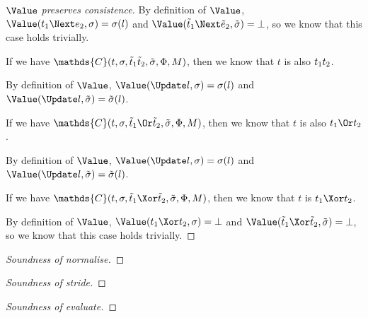\begin{proof}[$\Value$ preserves consistence]
{    By definition of $\Value$, $\Value(t_1\Next e_2,\sigma)=\sigma(l)$ and $\Value(\tilde{t}_1\Next \tilde{e}_2,\tilde{\sigma})=\bot$, so we know that this case holds trivially.

    }

    {
    If we have $\mathds{C}(t,\sigma,\tilde{t}_1\And \tilde{t}_2,\tilde{\sigma},\Phi,M)$, then we know that $t$ is also $t_1\relax t_2$.

    By definition of $\Value$, $\Value(\Update l,\sigma)=\sigma(l)$ and $\Value(\Update l,\tilde{\sigma})=\tilde{\sigma}(l)$.

    }

    {
    If we have $\mathds{C}(t,\sigma,\tilde{t}_1\Or \tilde{t}_2,\tilde{\sigma},\Phi,M)$, then we know that $t$ is also $t_1\Or t_2$.

    By definition of $\Value$, $\Value(\Update l,\sigma)=\sigma(l)$ and $\Value(\Update l,\tilde{\sigma})=\tilde{\sigma}(l)$.

    }

    {
    If we have $\mathds{C}(t,\sigma,\tilde{t}_1\Xor \tilde{t}_2,\tilde{\sigma},\Phi,M)$, then we know that $t$ is $t_1\Xor t_2$.

    By definition of $\Value$, $\Value(t_1\Xor t_2,\sigma)=\bot$ and $\Value(\tilde{t}_1\Xor \tilde{t}_2,\tilde{\sigma})=\bot$, so we know that this case holds trivially.

    }
\end{proof}

\begin{proof}[Soundness of normalise]

\end{proof}

\begin{proof}[Soundness of stride]

\end{proof}

\begin{proof}[Soundness of evaluate]

\end{proof}
